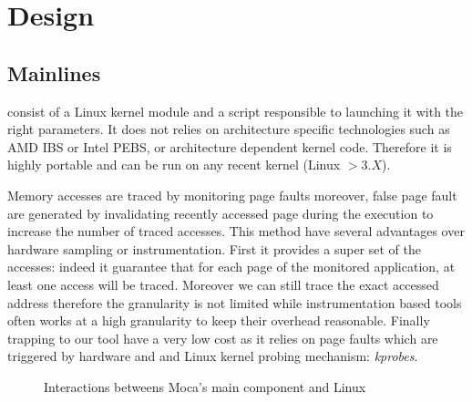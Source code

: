 \section{Design}
\label{sec:design}

\subsection{Mainlines}

\Moca consist of a Linux kernel module and a script responsible to launching it
with the right parameters. It does not relies on architecture specific
technologies such as AMD IBS or Intel PEBS, or architecture dependent kernel
code. Therefore it is highly portable and can be run on any recent kernel
(Linux $> 3.X$).

Memory accesses are traced by monitoring page faults moreover, false page
fault are generated by invalidating recently accessed page during the
execution to increase the number of traced accesses. This method have several
advantages over hardware sampling or instrumentation. First it provides a
super set of the accesses: indeed it guarantee that for each page of the
monitored application, at least one access will be traced. Moreover we can
still trace the exact accessed address therefore the granularity is not
limited while instrumentation based tools often works at a high granularity to
keep their overhead reasonable.  Finally trapping to our tool have a very low
cost as it relies on page faults which are triggered by hardware and and Linux
kernel probing mechanism: \emph{kprobes}.

\begin{figure}[htb]
    \centering
    \caption{Interactions betweens Moca's main component and Linux}
    \label{fig:moca}
\end{figure}

